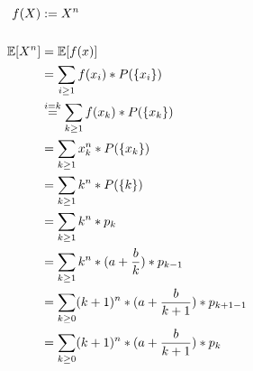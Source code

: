 \begin{align*}
	f(X) & := X^n \\
	 \\
	\mathbb{E}[X^n] & = \mathbb{E}[f(x)] \\
			& = \sum_{i \geq 1} f(x_i) * P(\{x_i\}) \\
			& \stackrel{i=k}{=} \sum_{k \geq 1} f(x_k) * P(\{x_k\}) \\
			& = \sum_{k \geq 1} x_k^n * P(\{x_k\}) \\
			& = \sum_{k \geq 1} k^n * P(\{k\}) \\
			& = \sum_{k \geq 1} k^n * p_k \\
			& = \sum_{k \geq 1} k^n * (a + \frac{b}{k}) * p_{k-1} \\
			& = \sum_{k \geq 0} (k + 1)^n * (a + \frac{b}{k + 1}) * p_{k+1-1} \\
			& = \sum_{k \geq 0} (k + 1)^n * (a + \frac{b}{k + 1}) * p_k \\
\end{align*}